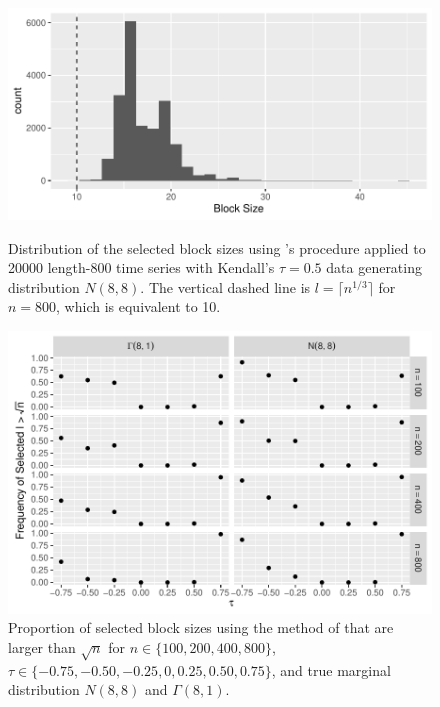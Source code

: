 \documentclass[12pt]{article}
\begin{document}
\begin{figure}[tbp]
  \centering
  \includegraphics[scale=1]{figures/block_dist}
  \caption{Distribution of the selected block sizes using
  \citet{politis2004automatic}'s procedure applied to 20000 length-800 time 
  series with
    Kendall's $\tau = 0.5$ data generating distribution $N(8,8)$. The vertical
    dashed line is $l = \lceil n^{1/3} \rceil$ for $n = 800$, which is equivalent 
    to 10.
  }
  \label{fig:block_dist}


  \centering
  \includegraphics[scale=1]{figures/large_block}
  \caption{Proportion of selected block sizes using the method of
  \citet{politis2004automatic} that are larger than
    $\sqrt{n}$ for $n \in \{100, 200, 400, 800\}$,
    $\tau \in \{-0.75, -0.50, -0.25, 0, 0.25, 0.50, 0.75\}$, and true
    marginal distribution $N(8,8)$ and $\Gamma(8,1)$.
  }
  \label{fig:large_block}
\end{figure}
\end{document}
